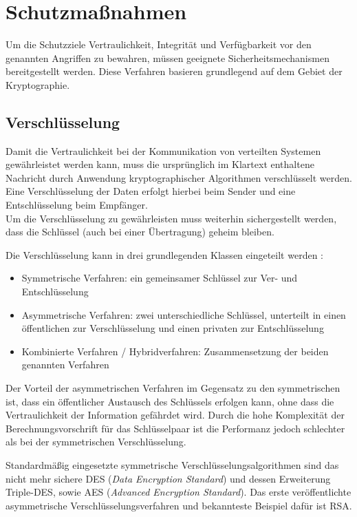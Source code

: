 \documentclass[12pt,a4paper,parskip=half]{scrreprt}
\begin{document}
		\section{Schutzmaßnahmen}
			
			Um die Schutzziele Vertraulichkeit, Integrität und Verfügbarkeit vor den genannten Angriffen zu bewahren, müssen geeignete Sicherheitsmechanismen bereitgestellt werden. Diese Verfahren basieren grundlegend auf dem Gebiet der Kryptographie.
			
			\subsection{Verschlüsselung}
				
				Damit die Vertraulichkeit bei der Kommunikation von verteilten Systemen gewährleistet werden kann, muss die ursprünglich im Klartext enthaltene Nachricht durch Anwendung kryptographischer Algorithmen verschlüsselt werden. Eine Verschlüsselung der Daten erfolgt hierbei beim Sender und eine Entschlüsselung beim Empfänger. \\
				Um die Verschlüsselung zu gewährleisten muss weiterhin sichergestellt werden, dass die Schlüssel (auch bei einer Übertragung) geheim bleiben.
				
				Die Verschlüsselung kann in drei grundlegenden Klassen eingeteilt werden \cite{verteilteSysteme} \cite{ITSicherheit}:
				\begin{itemize}
					\item Symmetrische Verfahren: ein gemeinsamer Schlüssel zur Ver- und Entschlüsselung
					\item Asymmetrische Verfahren: zwei unterschiedliche Schlüssel, unterteilt in einen öffentlichen zur Verschlüsselung und einen privaten zur Entschlüsselung
					\item Kombinierte Verfahren / Hybridverfahren: Zusammensetzung der beiden genannten Verfahren
				\end{itemize}
				
				Der Vorteil der asymmetrischen Verfahren im Gegensatz zu den symmetrischen ist, dass ein öffentlicher Austausch des Schlüssels erfolgen kann, ohne dass die Vertraulichkeit der Information gefährdet wird. Durch die hohe Komplexität der Berechnungsvorschrift für das Schlüsselpaar ist die Performanz jedoch schlechter als bei der symmetrischen Verschlüsselung.
				
				Standardmäßig eingesetzte symmetrische Verschlüsselungsalgorithmen sind das nicht mehr sichere DES (\textit{Data Encryption Standard}) und dessen Erweiterung Triple-DES, sowie AES (\textit{Advanced Encryption Standard}). Das erste veröffentlichte asymmetrische Verschlüsselungsverfahren und bekannteste Beispiel dafür ist RSA.
				
\end{document}
